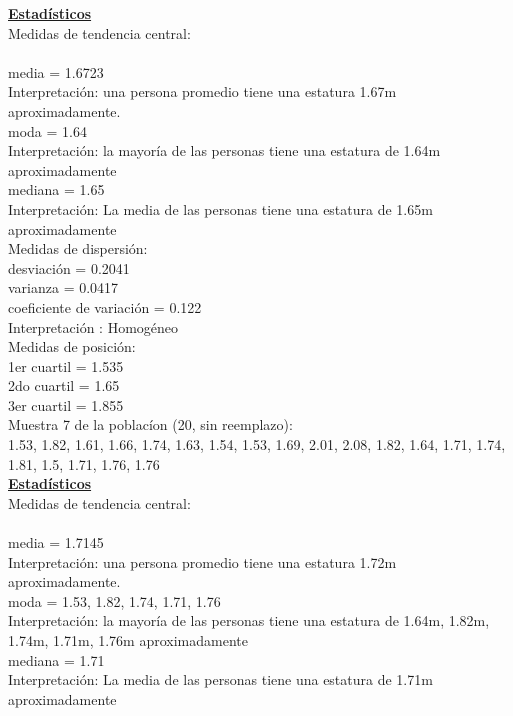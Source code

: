 \documentclass[a4paper,12pt]{article}
\begin{document}
\begin{enumerate}
\textbf{\underline{Estad\'isticos}}\\

Medidas de tendencia central:\\\\
media = 1.6723\\
Interpretaci\'on: una persona promedio tiene una estatura 1.67m aproximadamente.\\
moda = 1.64\\
Interpretaci\'on: la mayor\'ia de las personas tiene una estatura de 1.64m aproximadamente\\
mediana = 1.65\\
Interpretaci\'on: La media de las personas tiene una estatura de 1.65m aproximadamente\\

Medidas de dispersi\'on:\\
desviaci\'on = 0.2041\\
varianza = 0.0417\\
coeficiente de variaci\'on = 0.122\\
Interpretaci\'on : Homog\'eneo\\

Medidas de posici\'on:\\
1er cuartil = 1.535\\
2do cuartil = 1.65\\
3er cuartil = 1.855\\

Muestra 7 de la poblac\'ion (20, sin reemplazo):\\

1.53,	1.82,	1.61,	1.66,	1.74,	1.63,
1.54,	1.53,	1.69,	2.01,	2.08,	1.82,
1.64,	1.71,	1.74,	1.81,	1.5,    1.71,
1.76,	1.76\\

\textbf{\underline{Estad\'isticos}}\\

Medidas de tendencia central:\\\\
media = 1.7145\\
Interpretaci\'on: una persona promedio tiene una estatura 1.72m aproximadamente.\\
moda = 1.53, 1.82, 1.74, 1.71, 1.76\\
Interpretaci\'on: la mayor\'ia de las personas tiene una estatura de 1.64m, 1.82m, 1.74m, 1.71m, 1.76m aproximadamente\\
mediana = 1.71\\
Interpretaci\'on: La media de las personas tiene una estatura de 1.71m aproximadamente\\


\end{enumerate}
\end{document}
